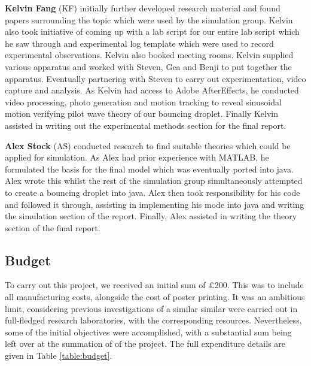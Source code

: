 \textbf{Kelvin Fang} (KF) initially further developed research material and found papers surrounding the topic which were used by the simulation group. Kelvin also took initiative of coming up with a lab script for our entire lab script which he saw through and experimental log template which were used to record experimental observations. Kelvin also booked meeting rooms. Kelvin supplied various apparatus and worked with Steven, Gea and Benji to put together the apparatus. Eventually partnering with Steven to carry out experimentation, video capture and analysis. As Kelvin had access to Adobe AfterEffects, he conducted video processing, photo generation and motion tracking to reveal sinusoidal motion verifying pilot wave theory of our bouncing droplet. Finally Kelvin assisted in writing out the experimental methods section for the final report.

\textbf{Alex Stock} (AS) conducted research to find suitable theories which could be applied for simulation. As Alex had prior experience with MATLAB, he formulated the basis for the final model which was eventually ported into java. Alex wrote this whilst the rest of the simulation group simultaneously attempted to create a bouncing droplet into java. Alex then took responsibility for his code and followed it through, assisting in implementing his mode into java and writing the simulation section of the report. Finally, Alex assisted in writing the theory section of the final report.


\subsection{Budget}
To carry out this project, we received an initial sum of \pounds200. This was to include all manufacturing costs, alongside the cost of poster printing. It was an ambitious limit, considering previous investigations of a similar similar were carried out in full-fledged research laboratories, with the corresponding resources. Nevertheless, some of the initial objectives were accomplished, with a substantial sum being left over at the summation of of the project. The full expenditure details are given in Table \ref{table:budget}. 

